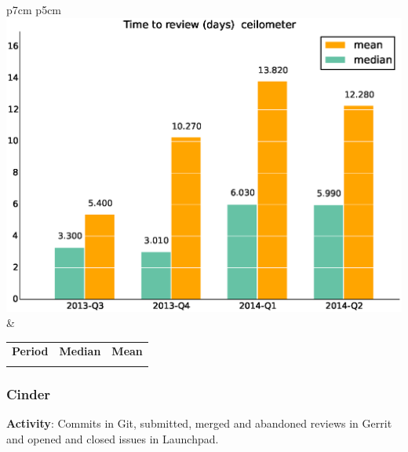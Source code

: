 \documentclass[a4wide,11pt]{report}
\begin{document}
\begin{tabular}{p{7cm} p{5cm}}
    \vspace{0pt} 
    \includegraphics[scale=.35]{figs/timetoreview_medianceilometer.eps}
    & 
    \vspace{0pt}
    \begin{tabular}{l|r|r|}%
    \bfseries Period & \bfseries Median & \bfseries Mean %
    \csvreader[head to column names]{data/timetoreview_medianceilometer.csv}{}%
    {\\ & \mediantime & \meantime}
    \end{tabular}
\end{tabular}


 \newpage 
 \subsubsection{Cinder}

\textbf{Activity}: Commits in Git, submitted, merged and abandoned reviews in Gerrit and opened and closed issues in Launchpad.
\end{document}
